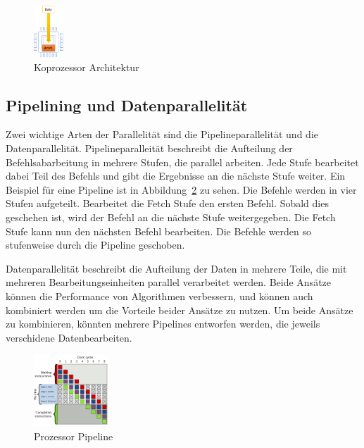 \documentclass[conference]{IEEEtran}
\begin{document}
\begin{figure}[htbp]
    \centering
    \includegraphics[width=0.1\textwidth]{imgs/Coprocessor.png}
    \caption{Koprozessor Architektur}
    \label{fig:coprocessor}
\end{figure}

\subsection{Pipelining und Datenparallelität}
Zwei wichtige Arten der Parallelität sind die Pipelineparallelität und die Datenparallelität. Pipelineparalleität beschreibt die Aufteilung der Befehlsabarbeitung
in mehrere Stufen, die parallel arbeiten. Jede Stufe bearbeitet dabei Teil des Befehls und gibt die Ergebnisse an die nächste Stufe weiter.
Ein Beispiel für eine Pipeline ist in Abbildung~\ref{fig:pipeline} zu sehen. Die Befehle werden in vier Stufen aufgeteilt. Bearbeitet die Fetch Stufe den ersten Befehl.
Sobald dies geschehen ist, wird der Befehl an die nächste Stufe weitergegeben. Die Fetch Stufe kann nun den nächsten Befehl bearbeiten. Die Befehle werden so stufenweise
durch die Pipeline geschoben.

Datenparallelität beschreibt die Aufteilung der Daten in mehrere Teile, die mit mehreren Bearbeitungseinheiten parallel verarbeitet werden. Beide Ansätze können die Performance
von Algorithmen verbessern, und können auch kombiniert werden um die Vorteile beider Ansätze zu nutzen. Um beide Ansätze zu kombinieren, könnten mehrere Pipelines entworfen werden,
die jeweils verschidene Datenbearbeiten.

\begin{figure}[htbp] %
    \centering
    \includegraphics[width=0.25\textwidth]{imgs/pipeline.png}
    \caption{Prozessor Pipeline}
    \label{fig:pipeline}
\end{figure}
\end{document}
